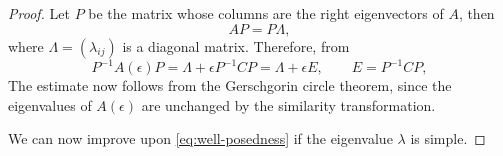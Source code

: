 \documentclass[../main.tex]{subfiles}
\begin{document}
\begin{proof}
	Let $P$ be the matrix whose columns are the right eigenvectors of $A$, then
	\begin{equation}
		A P = P \Lambda,
	\end{equation}
	where $\Lambda = (\lambda_{ij})$ is a diagonal matrix. Therefore, from
	\begin{equation*}
		P^{-1} A(\epsilon) P = \Lambda + \epsilon P^{-1} C P = \Lambda + \epsilon E, \qquad E = P^{-1} C P,
	\end{equation*}
	The estimate now follows from the Gerschgorin circle theorem, since the eigenvalues of $A(\epsilon)$ are unchanged by the similarity transformation.

	We can now improve upon \eqref{eq:well-posedness} if the eigenvalue $\lambda$ is simple.
\end{proof}
\end{document}
